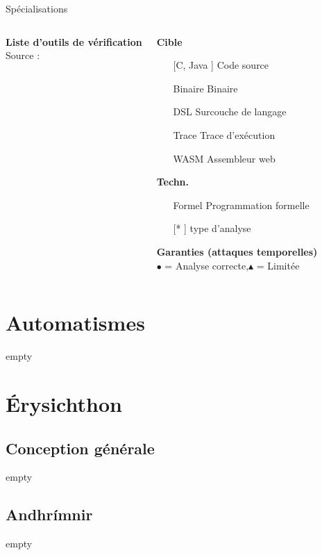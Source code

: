 \documentclass{backend/backend}
\begin{document}
\begin{frame}{Spécialisations}
\begin{columns}
    \textbf{Liste d’outils de vérification}\\[1ex]
    Source : \cite{notThatHardCT}\\[2ex]
    \begin{scriptsize}
        
        \textbf{Cible}
        \begin{itemize}
        \item[[C, Java]] Code source
        \item[Binaire] Binaire
        \item[DSL] Surcouche de langage
        \item[Trace] Trace d'exécution
        \item[WASM] Assembleur web
    \end{itemize}
    \textbf{Techn.}
    \begin{itemize}
        \item[Formel] Programmation formelle 
        \item[[*]] type d'analyse
    \end{itemize}
    \textbf{Garanties (attaques temporelles)}\\
        $\bullet$ = Analyse correcte,$\blacktriangle$ =  Limitée
    \end{scriptsize}
    \end{columns}
\end{frame}



\section{Automatismes}
\begin{frame}{empty}
    
\end{frame}
\section{Érysichthon}

\subsection{Conception générale}
\begin{frame}{empty}
    
\end{frame}
\subsection{Andhrímnir}
\begin{frame}{empty}
    
\end{frame}
\end{document}
